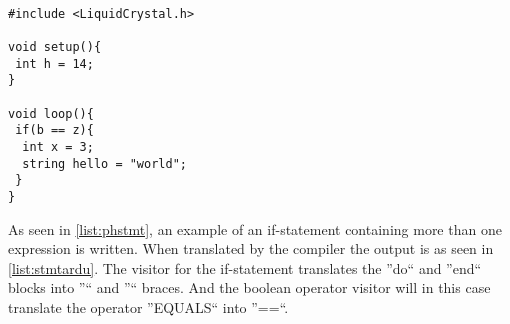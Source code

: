 \begin{lstlisting}[caption=Example of an if-statement in the Arduino language translated by the compiler from PH, label=list:stmtardu]

#include <LiquidCrystal.h>

void setup(){
 int h = 14;
}

void loop(){
 if(b == z){
  int x = 3;
  string hello = "world";
 }
}
\end{lstlisting}

As seen in \ref{list:phstmt}, an example of an if-statement containing more than one expression is written. When translated by the compiler the output is as seen in \ref{list:stmtardu}. The visitor for the if-statement translates the ''do`` and ''end`` blocks into ''{`` and ''}`` braces. And the boolean operator visitor will in this case translate the operator ''EQUALS`` into ''==``.